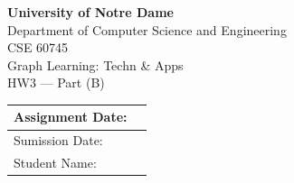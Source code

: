 \documentclass[11pt,a4paper]{article}
\begin{document}
\thispagestyle{plain}
\begin{center}
    \vspace*{2.2cm}
    {\LARGE\bfseries University of Notre Dame}\\[0.6em]
    {\Large Department of Computer Science and Engineering}\\[2.6cm]
    {\Large CSE 60745}\\[0.5em]
    {\Large Graph Learning: Techn \& Apps}\\[0.4em]
    {\large HW3 --- Part (B)}\\[1.8cm]

    \setlength{\extrarowheight}{10pt}
    \begin{tabular}{|p{}|p{}|}
        \hline
        Assignment Date: & \\[0.9em]
        \hline
        Sumission Date:  & \\[0.9em]
        \hline
        Student Name:    & \\[0.9em]
        \hline
    \end{tabular}
\end{center}
\clearpage


\end{document}

